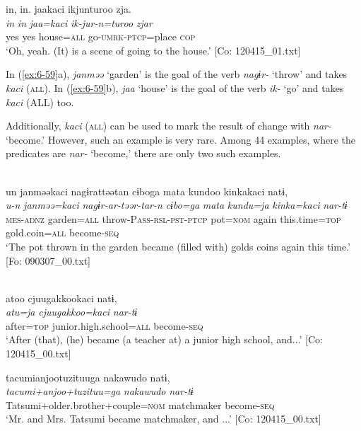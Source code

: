 {\TM}
\glll in,  in.  jaakaci  ikjunturoo  zja.\\
      \textit{in}  \textit{in}  \textit{jaa=kaci}  \textit{ik-jur-n=turoo}  \textit{zjar}\\
      yes  yes  house=\textsc{all}  go-\textsc{umrk}-\textsc{ptcp}=place  \textsc{cop}\\
\glt ‘Oh, yeah. (It) is a scene of going to the house.’ [Co: 120415\_01.txt]
\z
\z

In (\ref{ex:6-59}a), \textit{janməə} ‘garden’ is the goal of the verb \textit{nagɨr-} ‘throw’ and takes \textit{kaci} (\textsc{all}). In (\ref{ex:6-59}b), \textit{jaa} ‘house’ is the goal of the verb \textit{ik-} ‘go’ and takes \textit{kaci} (ALL) too.

Additionally, \textit{kaci} (\textsc{all}) can be used to mark the result of change with \textit{nar-} ‘become.’ However, such an example is very rare. Among 44 examples, where the predicates are \textit{nar-} ‘become,’ there are only two such examples.

\ea\label{ex:6-60}
\ea{}\\
{\TM}
\glll  un  janməəkaci  nagɨrattəətan  cɨboga mata  kundoo  kinkakaci  natɨ,\\
\textit{u-n}  \textit{janməə=kaci}  \textit{nagɨr-ar-təər-tar-n}  \textit{cɨbo=ga} \textit{mata}  \textit{kundu=ja}  \textit{kinka=kaci}  \textit{nar-tɨ}\\
\textsc{mes}-\textsc{adnz}  garden=\textsc{all}  throw-P\textsc{ass}-\textsc{rsl}-\textsc{pst}-\textsc{ptcp}  pot=\textsc{nom} again  this.time=\textsc{top}  gold.coin=\textsc{all}  become-\textsc{seq}\\
\glt ‘The pot thrown in the garden became (filled with) golds coins again this time.’ [Fo: 090307\_00.txt]

\ex{}\\
{\TM}
\glll  atoo  cjuugakkookaci  natɨ,\\
\textit{atu=ja}  \textit{cjuugakkoo=kaci}  \textit{nar-tɨ}\\
after=\textsc{top}  junior.high.school=\textsc{all}  become-\textsc{seq}\\
\glt ‘After (that), (he) became (a teacher at) a junior high school, and...’ [Co: 120415\_00.txt]

\ex
{\TM}
\glll tacumianjootuzituuga  nakawudo  natɨ,\\
\textit{tacumi+anjoo+tuzituu=ga}  \textit{nakawudo}  \textit{nar-tɨ}\\
Tatsumi+older.brother+couple=\textsc{nom}  matchmaker  become-\textsc{seq}\\
\glt ‘Mr. and Mrs. Tatsumi became matchmaker, and ...’ [Co: 120415\_00.txt]

